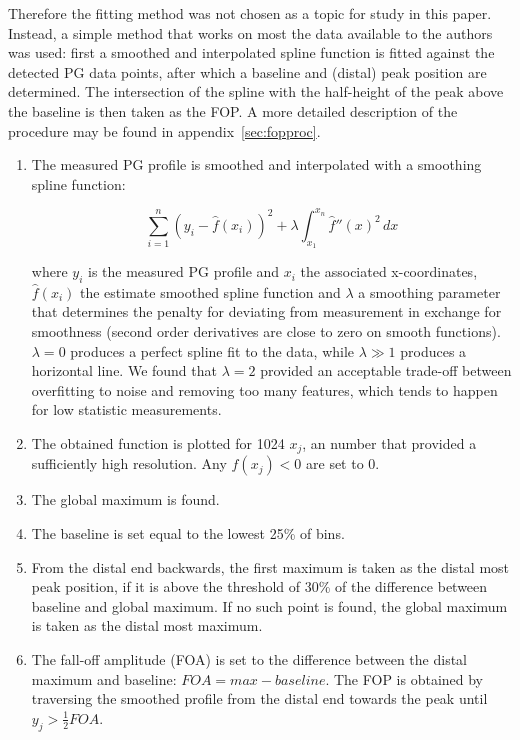 \documentclass[a4paper,english,12pt]{article}
\begin{document}
Therefore the fitting method was not chosen as a topic for study in this paper. Instead, a simple method that works on most the data available to the authors was used: first a smoothed and interpolated spline function is fitted against the detected PG data points, after which a baseline and (distal) peak position are determined. The intersection of the spline with the half-height of the peak above the baseline is then taken as the FOP. A more detailed description of the procedure may be found in appendix~\ref{sec:fopproc}.


\begin{enumerate}[noitemsep]
\item The measured PG profile is smoothed and interpolated with a smoothing spline function:

\begin{equation}
\sum_{i=1}^n (y_i - \hat f(x_i))^2 + \lambda \int_{x_1}^{x_n} \hat f''(x)^2 \,dx
\end{equation}

where $y_i$ is the measured PG profile and $x_i$ the associated x-coordinates, $\hat f(x_i)$ the estimate smoothed spline function and $\lambda$ a smoothing parameter that determines the penalty for deviating from measurement in exchange for smoothness (second order derivatives are close to zero on smooth functions). $\lambda = 0$ produces a perfect spline fit to the data, while $\lambda \gg 1$ produces a horizontal line. We found that $\lambda = 2$ provided an acceptable trade-off between overfitting to noise and removing too many features, which tends to happen for low statistic measurements.
\item The obtained function is plotted for 1024 $x_j$, an number that provided a sufficiently high resolution. Any $f(x_j) < 0$ are set to $0$. 
\item The global maximum is found.
\item The baseline is set equal to the lowest 25\% of bins.
\item From the distal end backwards, the first maximum is taken as the distal most peak position, if it is above the threshold of 30\% of the difference between baseline and global maximum. If no such point is found, the global maximum is taken as the distal most maximum.
\item The fall-off amplitude (FOA) is set to the difference between the distal maximum and baseline: $FOA = max-baseline$. The FOP is obtained by traversing the smoothed profile from the distal end towards the peak until $y_j > \frac{1}{2}FOA$.
\end{enumerate}
\end{document}
